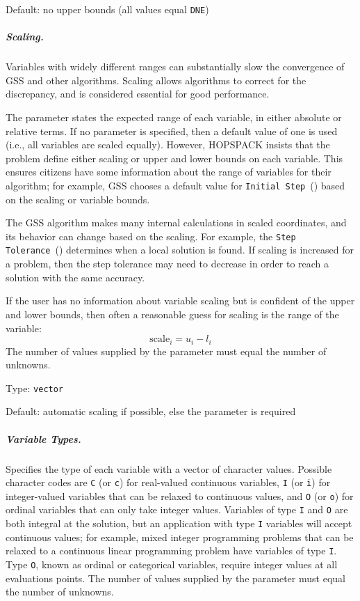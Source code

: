 \hspace{0.2in}
Default: no upper bounds (all values equal {\tt DNE})

\subparagraph{Scaling.}  \label{param:PD-scaling}
Variables with widely different ranges can substantially slow the convergence
of GSS and other algorithms.  Scaling allows algorithms to correct for the
discrepancy, and is considered essential for good performance.

\noindent
The parameter states the expected range of each variable, in either absolute
or relative terms.  If no parameter is specified, then a default value of one
is used (i.e., all variables are scaled equally).
However, HOPSPACK insists that the problem define either scaling or upper
and lower bounds on each variable.  This ensures citizens have some information
about the range of variables for their algorithm; for example, GSS chooses
a default value for {\tt Initial Step}~()
based on the scaling or variable bounds.

\noindent
The GSS algorithm makes many internal calculations in scaled coordinates, and
its behavior can change based on the scaling.  For example, the
{\tt Step Tolerance}~() determines when a local
solution is found.  If scaling is increased for a problem, then the step
tolerance may need to decrease in order to reach a solution with the same
accuracy.

\noindent
If the user has no information about variable scaling but is confident of the
upper and lower bounds, then often a reasonable guess for scaling is the
range of the variable:
\[
  \mbox{scale}_i = u_i - l_i
\]
The number of values supplied by the parameter must equal the number of unknowns.

\hspace{0.2in}
Type: {\tt vector}

\hspace{0.2in}
Default: automatic scaling if possible, else the parameter is required

\subparagraph{Variable Types.}  \label{param:PD-vartypes}
Specifies the type of each variable with a vector of character values.
Possible character codes are {\tt C} (or {\tt c}) for real-valued continuous
variables, {\tt I} (or {\tt i}) for integer-valued variables that can be
relaxed to continuous values, and {\tt O} (or {\tt o}) for ordinal
variables that can only take integer values.
Variables of type {\tt I} and {\tt O} are both integral at the solution, but
an application with type {\tt I} variables will accept continuous values;
for example, mixed integer programming problems that can be relaxed to
a continuous linear programming problem have variables of type {\tt I}.
Type {\tt O}, known as ordinal or categorical variables, require
integer values at all evaluations points.
The number of values supplied by the parameter must equal the number of unknowns.

